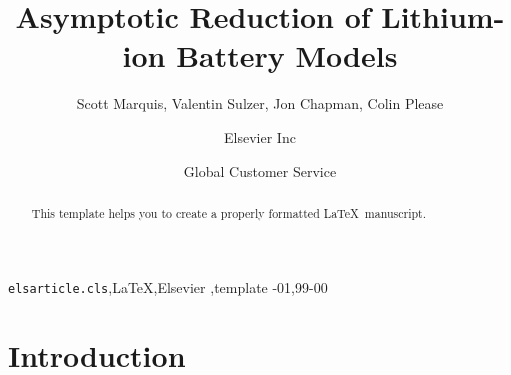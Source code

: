 \documentclass[preprint]{elsarticle}
\begin{document}
\begin{frontmatter}


\title{Asymptotic Reduction of Lithium-ion Battery Models}

\author{Scott Marquis, Valentin Sulzer, Jon Chapman, Colin Please}
\address{University of Oxford}

\author[mymainaddress,mysecondaryaddress]{Elsevier Inc}

\author[mysecondaryaddress]{Global Customer Service}

\address[mymainaddress]{1600 John F Kennedy Boulevard, Philadelphia}
\address[mysecondaryaddress]{360 Park Avenue South, New York}

\begin{abstract}
This template helps you to create a properly formatted \LaTeX\ manuscript.
\end{abstract}

\begin{keyword}
\texttt{elsarticle.cls}\sep \LaTeX\sep Elsevier \sep template
-01\sep  99-00
\end{keyword}

\end{frontmatter}

\linenumbers

\section{Introduction} 
\end{document}
